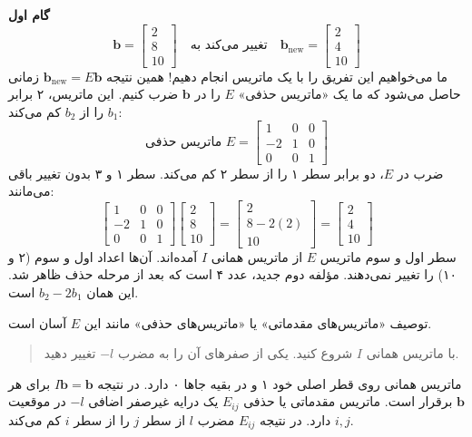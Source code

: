 \documentclass[12pt, a4paper]{book}
\begin{document}
	\textbf{گام اول}
	\[ \mathbf{b} = \begin{bmatrix} 2 \\ 8 \\ 10 \end{bmatrix} \quad \text{تغییر می‌کند به} \quad \mathbf{b}_{\text{new}} = \begin{bmatrix} 2 \\ 4 \\ 10 \end{bmatrix} \]
	ما می‌خواهیم این تفریق را با یک ماتریس انجام دهیم! همین نتیجه $\mathbf{b}_{\text{new}} = E\mathbf{b}$ زمانی حاصل می‌شود که ما یک «ماتریس حذفی» $E$ را در $\mathbf{b}$ ضرب کنیم. این ماتریس، ۲ برابر $b_1$ را از $b_2$ کم می‌کند:
	\[
	\text{ماتریس حذفی } E = \begin{bmatrix} 1 & 0 & 0 \\ -2 & 1 & 0 \\ 0 & 0 & 1 \end{bmatrix}
	\]
	ضرب در $E$، دو برابر سطر ۱ را از سطر ۲ کم می‌کند. سطر ۱ و ۳ بدون تغییر باقی می‌مانند:
	\[
	\begin{bmatrix} 1 & 0 & 0 \\ -2 & 1 & 0 \\ 0 & 0 & 1 \end{bmatrix}
	\begin{bmatrix} 2 \\ 8 \\ 10 \end{bmatrix}
	=
	\begin{bmatrix} 2 \\ 8-2(2) \\ 10 \end{bmatrix}
	=
	\begin{bmatrix} 2 \\ 4 \\ 10 \end{bmatrix}
	\]
	سطر اول و سوم ماتریس $E$ از ماتریس همانی $I$ آمده‌اند. آن‌ها اعداد اول و سوم (۲ و ۱۰) را تغییر نمی‌دهند. مؤلفه دوم جدید، عدد ۴ است که بعد از مرحله حذف ظاهر شد. این همان $b_2 - 2b_1$ است.
	
	توصیف «ماتریس‌های مقدماتی» یا «ماتریس‌های حذفی» مانند این $E$ آسان است.
	\begin{quote}
		با ماتریس همانی $I$ شروع کنید. یکی از صفرهای آن را به مضرب $-l$ تغییر دهید.
	\end{quote}
	ماتریس همانی روی قطر اصلی خود ۱ و در بقیه جاها ۰ دارد. در نتیجه $I\mathbf{b}=\mathbf{b}$ برای هر $\mathbf{b}$ برقرار است.
	ماتریس مقدماتی یا حذفی $E_{ij}$ یک درایه غیرصفر اضافی $-l$ در موقعیت $i,j$ دارد. در نتیجه $E_{ij}$ مضرب $l$ از سطر $j$ را از سطر $i$ کم می‌کند.
	
\end{document}
